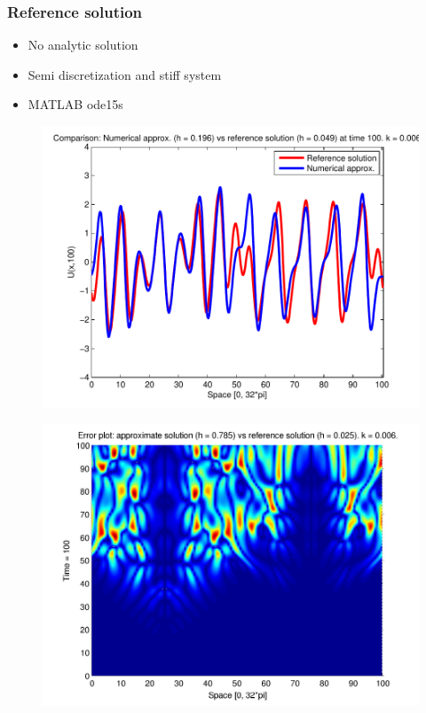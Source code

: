 \documentclass[screen]{beamer}
\begin{document}
\begin{frame}
\frametitle{Reference solution}
\begin{itemize}
\item No analytic solution
\item Semi discretization and stiff system
\item MATLAB ode15s
\end{itemize}
\end{frame}


\begin{frame}

\begin{figure}[htb]
\includegraphics[width=1\textwidth]{comp_num_ref_t100.pdf}
\end{figure}

\end{frame}


\begin{frame}

\begin{figure}[htb]
\includegraphics[width=1\textwidth]{error_num_ref_t100_3rd.pdf}
\end{figure}

\end{frame}
\end{document}
